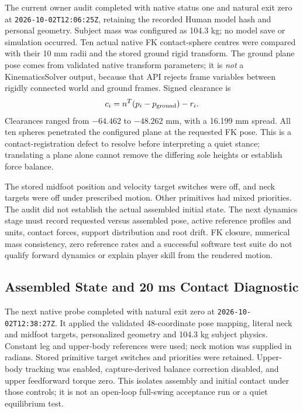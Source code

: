 \documentclass[11pt,a4paper]{article}
\begin{document}
The current owner audit completed with native status one and natural exit
zero at \texttt{2026-10-02T12:06:25Z}, retaining the recorded Human model
hash and personal geometry. Subject mass was configured as 104.3 kg; no
model save or simulation occurred. Ten actual native FK contact-sphere
centres were compared with their 10 mm radii and the stored ground rigid
transform. The ground plane pose comes from validated native transform
parameters; it is \emph{not} a KinematicsSolver output, because that API
rejects frame variables between rigidly connected world and ground frames.
Signed clearance is
\[
 c_i=n^T(p_i-p_{\rm ground})-r_i.
\]
Clearances ranged from $-64.462$ to $-48.262$ mm, with a 16.199 mm spread.
All ten spheres penetrated the configured plane at the requested FK pose.
This is a contact-registration defect to resolve before interpreting a
quiet stance; translating a plane alone cannot remove the differing sole
heights or establish force balance.

The stored midfoot position and velocity target switches were off, and neck
targets were off under prescribed motion. Other primitives had mixed
priorities. The audit did not establish the actual assembled initial state.
The next dynamics stage must record requested versus assembled pose, active
reference profiles and units, contact forces, support distribution and root
drift. FK closure, numerical mass consistency, zero reference rates and a
successful software test suite do not qualify forward dynamics or explain
player skill from the rendered motion.


\subsection{Assembled State and 20 ms Contact Diagnostic}
The next native probe completed with natural exit zero at
\texttt{2026-10-02T12:38:27Z}. It applied the validated 48-coordinate pose
mapping, literal neck and midfoot targets, personalized geometry and
104.3 kg subject physics. Constant leg and upper-body references were used;
neck motion was supplied in radians. Stored primitive target switches and
priorities were retained. Upper-body tracking was enabled, capture-derived
balance correction disabled, and upper feedforward torque zero. This isolates
assembly and initial contact under those controls; it is not an open-loop
full-swing acceptance run or a quiet equilibrium test.
\end{document}
